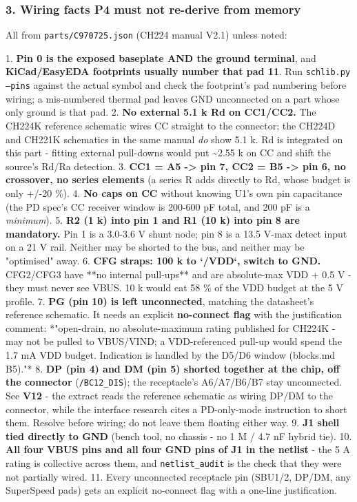 \documentclass[11pt,a4paper]{article}
\begin{document}
\subsubsection*{3. Wiring facts P4 must not re-derive from memory}
All from \texttt{parts/C970725.json} (CH224 manual V2.1) unless noted:

1. \textbf{Pin 0 is the exposed baseplate AND the ground terminal}, and \textbf{KiCad/EasyEDA footprints usually number that pad 11}. Run \texttt{schlib.py --pins} against the actual symbol and check the footprint's pad numbering before wiring; a mis-numbered thermal pad leaves GND unconnected on a part whose only ground is that pad. 2. \textbf{No external 5.1 k Rd on CC1/CC2.} The CH224K reference schematic wires CC straight to the connector; the CH224D and CH221K schematics in the same manual \emph{do} show 5.1 k. Rd is integrated on this part - fitting external pull-downs would put \textasciitilde{}2.55 k on CC and shift the source's Rd/Ra detection. 3. \textbf{CC1 = A5 -\textgreater{} pin 7, CC2 = B5 -\textgreater{} pin 6, no crossover, no series elements} (a series R adds directly to Rd, whose budget is only +/-20 \%). 4. \textbf{No caps on CC} without knowing U1's own pin capacitance (the PD spec's CC receiver window is 200-600 pF total, and 200 pF is a \emph{minimum}). 5. \textbf{R2 (1 k) into pin 1 and R1 (10 k) into pin 8 are mandatory.} Pin 1 is a 3.0-3.6 V shunt node; pin 8 is a 13.5 V-max detect input on a 21 V rail. Neither may be shorted to the bus, and neither may be "optimised" away. 6. \textbf{CFG straps: 100 k to `/VDD`, switch to GND.} CFG2/CFG3 have {*}{*}no internal pull-ups{*}{*} and are absolute-max VDD + 0.5 V - they must never see VBUS. 10 k would eat 58 \% of the VDD budget at the 5 V profile. 7. \textbf{PG (pin 10) is left unconnected}, matching the datasheet's reference schematic. It needs an explicit \textbf{no-connect flag} with the justification comment: {*}"open-drain, no absolute-maximum rating published for CH224K - may not be pulled to VBUS/VIND; a VDD-referenced pull-up would spend the 1.7 mA VDD budget. Indication is handled by the D5/D6 window (blocks.md B5)."{*} 8. \textbf{DP (pin 4) and DM (pin 5) shorted together at the chip, off the connector} (\texttt{/BC12\_DIS}); the receptacle's A6/A7/B6/B7 stay unconnected. See \textbf{V12} - the extract reads the reference schematic as wiring DP/DM to the connector, while the interface research cites a PD-only-mode instruction to short them. Resolve before wiring; do not leave them floating either way. 9. \textbf{J1 shell tied directly to GND} (bench tool, no chassis - no 1 M / 4.7 nF hybrid tie). 10. \textbf{All four VBUS pins and all four GND pins of J1 in the netlist} - the 5 A rating is collective across them, and \texttt{netlist\_audit} is the check that they were not partially wired. 11. Every unconnected receptacle pin (SBU1/2, DP/DM, any SuperSpeed pads) gets an explicit no-connect flag with a one-line justification.
\end{document}
